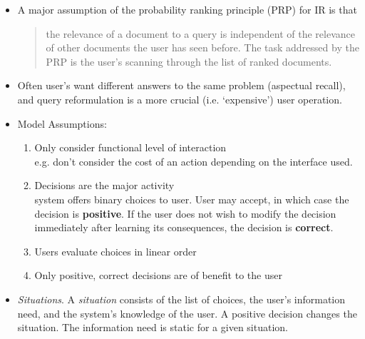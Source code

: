 \documentclass{article}
\newcommand{\note}[1]{{\footnotesize #1}}
\newcommand{\hii}[1]{{\it #1}}
\begin{document}
\begin{itemize}

\item A major assumption of the probability ranking principle (PRP) for IR is that
    \begin{quote}
        the relevance of a document to a query is independent of the relevance of other documents the user has seen before.  The task addressed by the PRP is the user's scanning through the list of ranked documents.
    \end{quote}

\item Often user's want different answers to the same problem (aspectual recall), and query reformulation is a more crucial (i.e. `expensive') user operation.

\item Model Assumptions:
    \begin{enumerate}
        \item Only consider functional level of interaction \\
        \note{ e.g. don't consider the cost of an action depending on the interface used.}
        \item Decisions are the major activity \\
        \note{ system offers binary choices to user.  User may accept, in which case the decision is {\bf positive}.  If the user does not wish to modify the decision immediately after learning its consequences, the decision is {\bf correct}.}
        \item Users evaluate choices in linear order
        \item Only positive, correct decisions are of benefit to the user
    \end{enumerate}

\item \hii{Situations}.  A {\it situation} consists of the list of choices, the user's information need, and the system's knowledge of the user.  A positive decision changes the situation.  The information need is static for a given situation.


\end{itemize}
\end{document}
